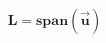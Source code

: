 \documentclass[preview]{standalone}
\begin{document}
\begin{align*}
\mathbf{L} = \textbf{span}(\mathbf{\vec{u}})
\end{align*}
\end{document}
